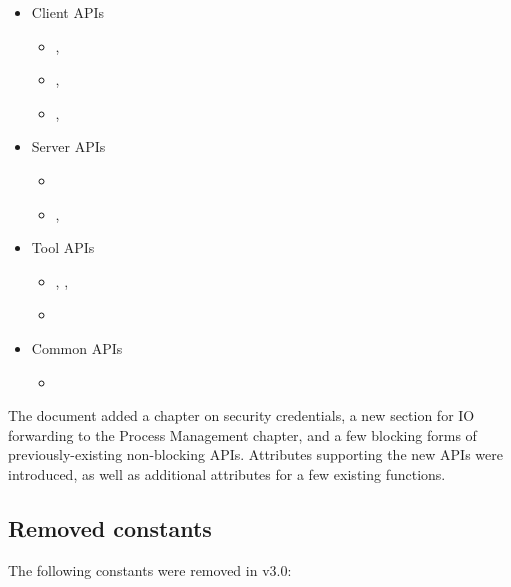 \begin{itemize}
\item Client APIs
\begin{itemize}
\item {}, 
\item {}, 
\item {}, 
\end{itemize}
\item Server \acp{API}
\begin{itemize}
\item {}
\item {}, 
\end{itemize}
\item Tool \acp{API}
\begin{itemize}
\item {}, , 
\item {}
\end{itemize}
\item Common \acp{API}
\begin{itemize}
\item {}
\end{itemize}
\end{itemize}

The document added a chapter on security credentials, a new section for \ac{IO} forwarding to the Process Management chapter, and a few blocking forms of previously-existing non-blocking \acp{API}. Attributes supporting the new \acp{API} were introduced, as well as additional attributes for a few existing functions.

\subsection{Removed constants}

The following constants were removed in v3.0:

\begin{constantdesc}


\end{constantdesc}

